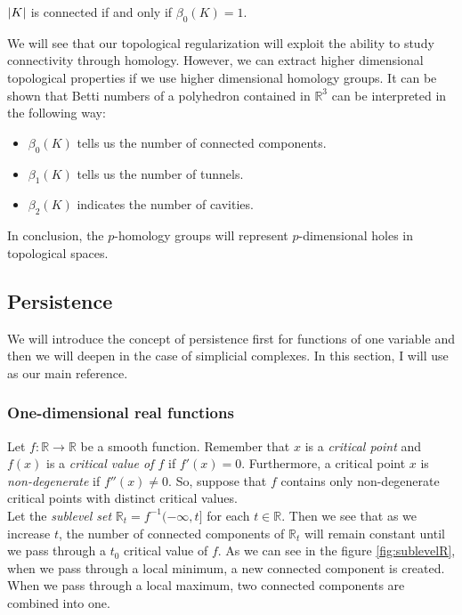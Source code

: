 \documentclass[../main.tex]{subfiles}
\begin{document}
\begin{corollary}
$\lvert K\rvert$ is connected if and only if $\beta_0(K)=1$.
\end{corollary}

We will see that our topological regularization will exploit the ability to study connectivity through homology. However, we can extract higher dimensional topological properties if we use higher dimensional homology groups. It can be shown \cite[Chapter~5]{edelsbrunner_computational_2010} that Betti numbers of a polyhedron contained in $\mathbb{R}^3$ can be interpreted in the following way:
\begin{itemize}
\item $\beta_0(K)$ tells us the number of connected components.
\item $\beta_1(K)$ tells us the number of tunnels.
\item $\beta_2(K)$ indicates the number of cavities.
\end{itemize}

In conclusion, the $p$-homology groups will represent $p$-dimensional holes in topological spaces.

\subsection{Persistence}
We will introduce the concept of persistence first for functions of one variable and then we will deepen in the case of simplicial complexes. In this section, I will use \cite{goodman_persistent_2008} as our main reference.

\subsubsection*{One-dimensional real functions}
Let $f: \mathbb{R} \to \mathbb{R}$ be a smooth function. Remember that $x$ is a \emph{critical point} and $f(x)$ is a \emph{critical value of $f$} if $f'(x)=0$. Furthermore, a critical point $x$ is \emph{non-degenerate} if $f''(x) \neq 0$. So, suppose that $f$ contains only non-degenerate critical points with distinct critical values.\\

Let the \emph{sublevel set} $\mathbb{R}_t=f^{-1}(-\infty, t]$ for each $t \in \mathbb{R}$. Then we see that as we increase $t$, the number of connected components of $\mathbb{R}_t$ will remain constant until we pass through a $t_0$ critical value of $f$.  As we can see in the figure \ref{fig:sublevelR}, when we pass through a local minimum, a new connected component is created. When we pass through a local maximum, two connected components are combined into one.\\
\end{document}
